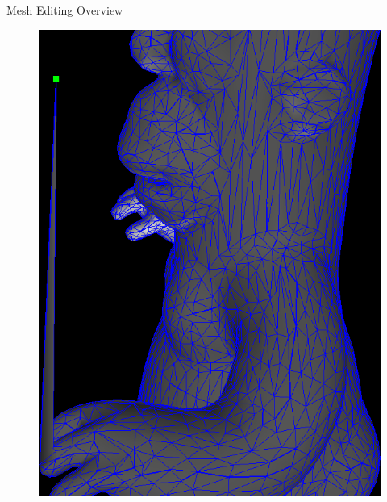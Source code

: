 \documentclass{beamer}
\begin{document}
\begin{frame}{Mesh Editing Overview}
\begin{figure}
\begin{minipage}{0.4\textwidth}
    \includegraphics[width=\textwidth]{HomerPointDrag2.png}
\end{minipage}
\end{figure}

\end{frame}
\end{document}
